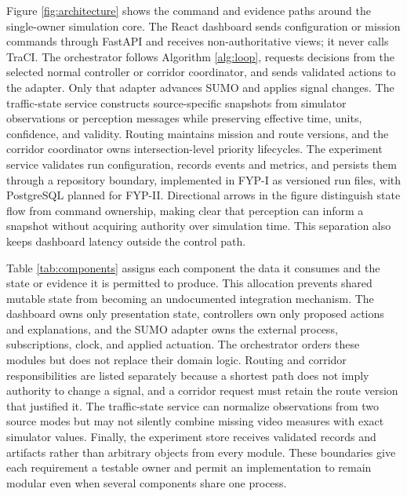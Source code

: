 Figure \ref{fig:architecture} shows the command and evidence paths around the single-owner simulation core. The React dashboard sends configuration or mission commands through FastAPI and receives non-authoritative views; it never calls TraCI. The orchestrator follows Algorithm \ref{alg:loop}, requests decisions from the selected normal controller or corridor coordinator, and sends validated actions to the adapter. Only that adapter advances SUMO and applies signal changes. The traffic-state service constructs source-specific snapshots from simulator observations or perception messages while preserving effective time, units, confidence, and validity. Routing maintains mission and route versions, and the corridor coordinator owns intersection-level priority lifecycles. The experiment service validates run configuration, records events and metrics, and persists them through a repository boundary, implemented in FYP-I as versioned run files, with PostgreSQL planned for FYP-II. Directional arrows in the figure distinguish state flow from command ownership, making clear that perception can inform a snapshot without acquiring authority over simulation time. This separation also keeps dashboard latency outside the control path.


Table \ref{tab:components} assigns each component the data it consumes and the state or evidence it is permitted to produce. This allocation prevents shared mutable state from becoming an undocumented integration mechanism. The dashboard owns only presentation state, controllers own only proposed actions and explanations, and the SUMO adapter owns the external process, subscriptions, clock, and applied actuation. The orchestrator orders these modules but does not replace their domain logic. Routing and corridor responsibilities are listed separately because a shortest path does not imply authority to change a signal, and a corridor request must retain the route version that justified it. The traffic-state service can normalize observations from two source modes but may not silently combine missing video measures with exact simulator values. Finally, the experiment store receives validated records and artifacts rather than arbitrary objects from every module. These boundaries give each requirement a testable owner and permit an implementation to remain modular even when several components share one process.

